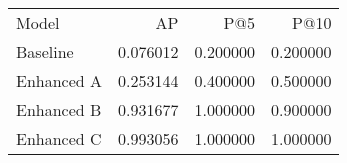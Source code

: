 \begin{tabular}{lrrr}
Model & AP & P@5 & P@10 \\
Baseline & 0.076012 & 0.200000 & 0.200000 \\
Enhanced A & 0.253144 & 0.400000 & 0.500000 \\
Enhanced B & 0.931677 & 1.000000 & 0.900000 \\
Enhanced C & 0.993056 & 1.000000 & 1.000000 \\
\end{tabular}
